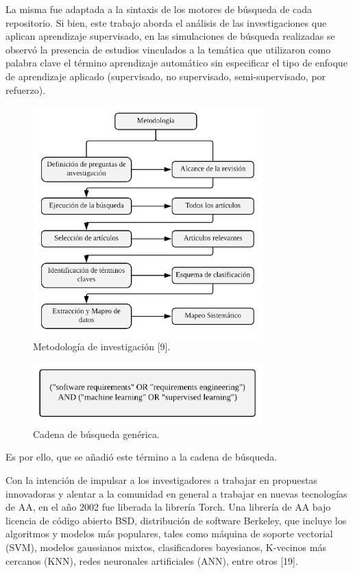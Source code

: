 \documentclass[journal]{IEEEtran}
\begin{document}
La misma fue adaptada a la sintaxis de los motores de búsqueda de cada repositorio. Si bien, este trabajo aborda el análisis de las investigaciones que aplican aprendizaje supervisado, en las simulaciones de búsqueda realizadas se observó la presencia de estudios vinculados a la temática que utilizaron como palabra clave el término aprendizaje automático sin especificar el tipo de enfoque de aprendizaje aplicado (supervisado, no supervisado, semi-supervisado, por refuerzo).

\begin{figure}[!t]
\centering
\includegraphics[width=3.5in]{figures/figure2_Guada.png}
\caption{Metodología de investigación \cite{petersen2008systematic}[9].}
\label{fig2}
\end{figure}


\begin{figure}[!t]
\centering
\includegraphics[width=3.5in]{figures/figure3_Guada.png}
\caption{Cadena de búsqueda genérica.}
\label{fig3}
\end{figure}

Es por ello, que se añadió este término a la cadena de búsqueda.

Con la intención de impulsar a los investigadores a trabajar en propuestas innovadoras y alentar a la comunidad en general a trabajar en nuevas tecnologías de AA, en el año 2002 fue liberada la librería Torch. Una librería de AA bajo licencia de código abierto BSD, distribución de software Berkeley, que 
incluye los algoritmos y modelos más populares, tales como máquina de soporte vectorial (SVM), modelos gaussianos mixtos, clasificadores bayesianos, K-vecinos más cercanos (KNN), redes neuronales artificiales (ANN), entre otros \cite{collobert2002torch}[19].
\end{document}

